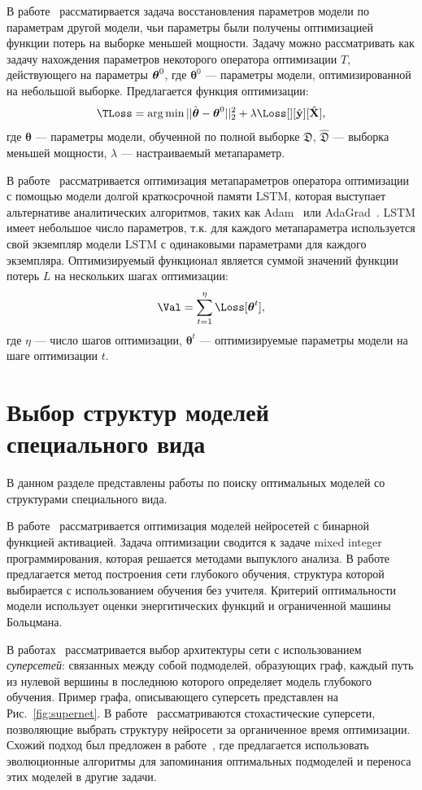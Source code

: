 В работе~\cite{l2l} рассматирвается задача восстановления параметров модели по параметрам  другой модели, чьи параметры были получены оптимизацией функции потерь на выборке меньшей мощности. Задачу можно рассматривать как задачу нахождения параметров некоторого оператора оптимизации $T$, действующего на параметры $\boldsymbol{\theta}^0$, где $\boldsymbol{\theta}^0$ --- параметры модели, оптимизированной на небольшой выборке.  Предлагается функция оптимизации:
\[
   \TLoss  = \argmin ||\hat{\boldsymbol{\theta}} -  \boldsymbol{\theta}^0||_2^2 + \lambda \Loss[][\hat{\y}][\hat{\X}],
\]
где $\boldsymbol{\theta}$ --- параметры модели, обученной по полной выборке $\mathfrak{D}$, $\hat{\mathfrak{D}}$ --- выборка меньшей мощности, ${\lambda}$ --- настраиваемый метапараметр.

В работе~\cite{l2l_by_gd_gd} рассматривается оптимизация метапараметров оператора оптимизации с помощью модели долгой краткосрочной памяти LSTM, которая выступает альтернативе аналитических алгоритмов, таких как Adam~\cite{adam} или AdaGrad~\cite{adagrad}. LSTM имеет небольшое число параметров, т.к. для каждого метапараметра используется свой экземпляр модели LSTM с одинаковыми параметрами для каждого экземпляра. Оптимизируемый функционал является суммой значений функции потерь $L$ на нескольких шагах оптимизации:
\[
   \Val = \sum_{t=1}^\eta \Loss[\teta^{t}],
\]
где $\eta$ --- число шагов оптимизации, $\boldsymbol{\theta}^t$ --- оптимизируемые параметры модели на шаге оптимизации $t$.


\section{Выбор структур моделей специального вида}
В данном разделе представлены работы по поиску оптимальных моделей со структурами специального вида.

В работе~\cite{mixed} рассматривается оптимизация моделей нейросетей с бинарной функцией активацией. Задача оптимизации сводится к задаче mixed integer программирования, которая решается методами выпуклого анализа.
В работе~\cite{energynet} предлагается метод построения сети глубокого обучения, структура которой выбирается с использованием обучения без учителя. Критерий оптимальности модели использует оценки энергитических функций и ограниченной машины Больцмана.

В работах~\cite{pathnet, supernet} рассматривается выбор архитектуры сети с использованием \textit{суперсетей}: связанных между собой подмоделей, образующих граф, каждый  путь из нулевой вершины в последнюю которого определяет модель глубокого обучения. Пример графа, описывающего суперсеть представлен на Рис.~\ref{fig:supernet}. В работе~\cite{supernet} рассматриваются стохастические суперсети, позволяющие выбрать структуру нейросети за органиченное время оптимизации. 
Схожий подход был предложен в работе~\cite{pathnet}, где предлагается использовать эволюционные алгоритмы для запоминания оптимальных подмоделей и переноса этих моделей в другие задачи.


